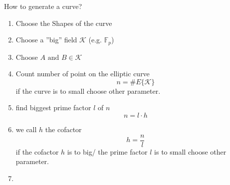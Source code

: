 \documentclass{beamer}
\begin{document}
\begin{frame}{How to generate a curve?}
\begin{enumerate}
	\item Choose the Shapes of the curve
	\begin{figure}
		\begin{tikzpicture}
		\end{tikzpicture}
	\end{figure}
	\item Choose a ''big'' field $\mathcal{K}$ (e.g. $\mathbb{F}_p$)
	\item Choose $A \text{ and } B \in \mathcal{K}$ 
	\item Count number of point on the elliptic curve 
	\[n = \#E\{\mathcal{K}\}\]
	if the curve is to small choose other parameter. 
	\item find biggest prime factor $l$ of $n$ \[n = l \cdot h\]
	\item we call $h$ the cofactor \[h = \frac{n}{l}\]
	if the cofactor $h$ is to big/ the prime factor $l$ is to small choose other parameter.
	\item 
	
\end{enumerate}
\end{frame} 
\end{document}
